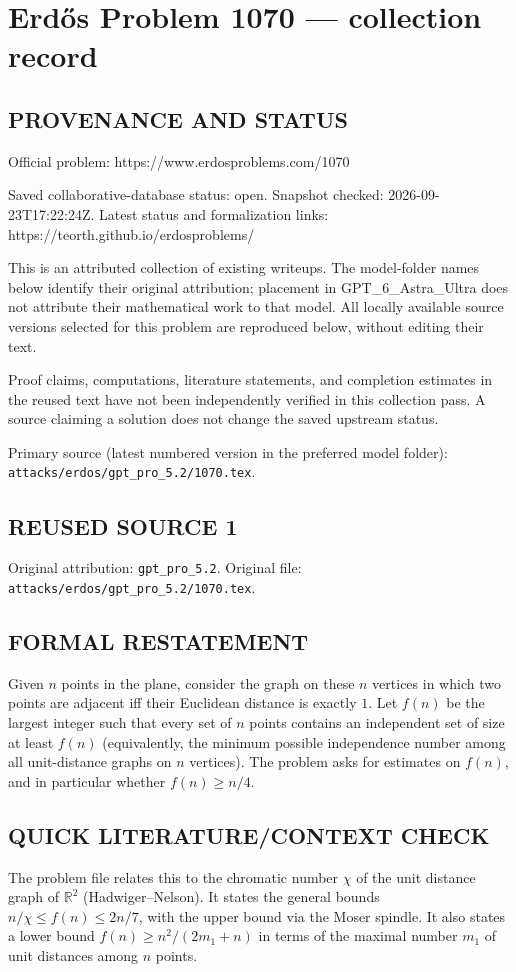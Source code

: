 \section*{Erd\H{o}s Problem 1070 --- collection record}

\subsection*{PROVENANCE AND STATUS}
Official problem: https://www.erdosproblems.com/1070

Saved collaborative-database status: open.
Snapshot checked: 2026-09-23T17:22:24Z.
Latest status and formalization links: https://teorth.github.io/erdosproblems/

This is an attributed collection of existing writeups. The model-folder names below identify their original attribution; placement in GPT\_6\_Astra\_Ultra does not attribute their mathematical work to that model. All locally available source versions selected for this problem are reproduced below, without editing their text.

Proof claims, computations, literature statements, and completion estimates in the reused text have not been independently verified in this collection pass. A source claiming a solution does not change the saved upstream status.

Primary source (latest numbered version in the preferred model folder): \texttt{attacks/erdos/gpt\_pro\_5.2/1070.tex}.

\subsection*{REUSED SOURCE 1}
Original attribution: \texttt{gpt\_pro\_5.2}.
Original file: \texttt{attacks/erdos/gpt\_pro\_5.2/1070.tex}.


\subsection*{FORMAL RESTATEMENT}
Given $n$ points in the plane, consider the graph on these $n$ vertices in which two points are adjacent iff their Euclidean distance is exactly $1$.
Let $f(n)$ be the largest integer such that every set of $n$ points contains an independent set of size at least $f(n)$ (equivalently, the minimum possible independence number among all unit-distance graphs on $n$ vertices).
The problem asks for estimates on $f(n)$, and in particular whether $f(n)\ge n/4$.

\subsection*{QUICK LITERATURE/CONTEXT CHECK}
The problem file relates this to the chromatic number $\chi$ of the unit distance graph of $\mathbb{R}^2$ (Hadwiger--Nelson).  It states the general bounds $n/\chi\le f(n)\le 2n/7$, with the upper bound via the Moser spindle.  It also states a lower bound $f(n)\ge n^2/(2m_1+n)$ in terms of the maximal number $m_1$ of unit distances among $n$ points.

